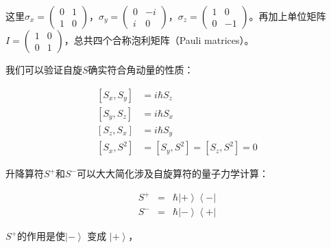 这里$\sigma_x = \left( \begin{array}{ccc} 0 &  1 \\ 1 & 0 \end{array} \right) $，$\sigma_y = \left( \begin{array}{ccc} 0 &  -i \\ i & 0 \end{array} \right) $，$\sigma_z = \left( \begin{array}{ccc} 1 &  0 \\ 0 & -1 \end{array} \right) $。再加上单位矩阵$I =  \left( \begin{array}{ccc} 1 &  0 \\ 0 & 1 \end{array} \right)$，总共四个合称泡利矩阵（Pauli matrices）。





我们可以验证自旋$S$确实符合角动量的性质：

\begin{align}
\left[ S_x , S_y  \right] & = i \hbar S_z \\
\left[ S_y , S_z  \right] & = i \hbar S_x \\
\left[ S_z , S_x  \right] & = i \hbar S_y \\
\left[S_x , S^2 \right]  & = \left[S_y , S^2 \right] = \left[S_z , S^2 \right] = 0~
\end{align}

升降算符$S^+$和$S^-$可以大大简化涉及自旋算符的量子力学计算：


\begin{align}
S^+ & = & \hbar  \left| + \right\rangle \left\langle - \right| \\
S^- & = &\hbar  \left| - \right\rangle \left\langle + \right|~
\end{align}

$S^+$的作用是使$\left| - \right\rangle$ 变成 $\left| + \right\rangle$，

